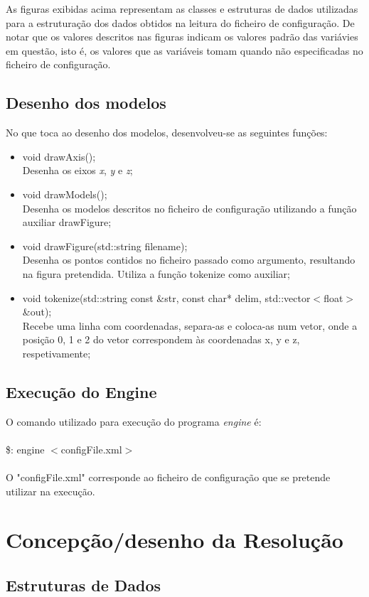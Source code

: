 \documentclass[11pt,a4paper]{report}%
\begin{document}
As figuras exibidas acima representam as classes e estruturas de dados utilizadas para a estruturação dos dados obtidos na leitura do ficheiro de configuração. De notar que os valores descritos nas figuras indicam os valores padrão das variávies em questão, isto é, os valores que as variáveis tomam quando não especificadas no ficheiro de configuração.

\section{Desenho dos modelos}
No que toca ao desenho dos modelos, desenvolveu-se as seguintes funções:
\begin{itemize}
\item void drawAxis(); \\ Desenha os eixos \emph{x}, \emph{y} e \emph{z};
\item void drawModels(); \\ Desenha os modelos descritos no ficheiro de configuração utilizando a função auxiliar drawFigure;
\item void drawFigure(std::string filename); \\ Desenha os pontos contidos no ficheiro passado como argumento, resultando na figura pretendida. Utiliza a função tokenize como auxiliar;
\item void tokenize(std::string const \&str, const char* delim, std::vector$<$float$>$ \&out); \\ Recebe uma linha com coordenadas, separa-as e coloca-as num vetor, onde a posição 0, 1 e 2 do vetor correspondem às coordenadas x, y e z, respetivamente;
\end{itemize}

\section{Execução do Engine}
O comando utilizado para execução do programa \emph{engine} é: \\ \\
\$: engine $<$configFile.xml$>$ \\ \\ O "configFile.xml" corresponde ao ficheiro de configuração que se pretende utilizar na execução.

\chapter{Concepção/desenho da Resolução}
\section{Estruturas de Dados}
\end{document}
